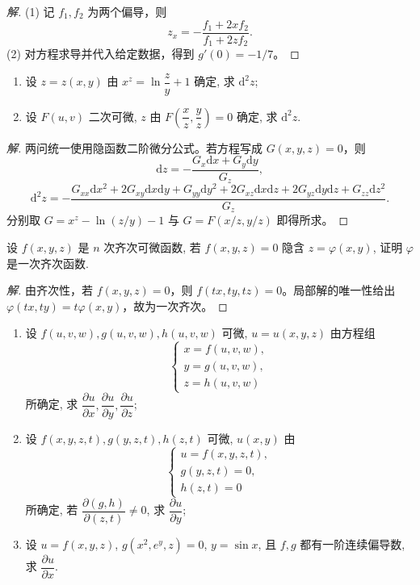 \documentclass[../../数学分析培优讲义(答案版).tex]{subfiles}
\begin{document}
\begin{proof}[解]
(1) 记 $f_1,f_2$ 为两个偏导，则
\[
z_x=-\dfrac{f_1+2xf_2}{f_1+2zf_2}.
\]
(2) 对方程求导并代入给定数据，得到 $g'(0)=-1/7$。
\end{proof}

\begin{example}
\begin{enumerate}[label=(\arabic*)]
    \item 设 $z=z(x,y)$ 由 $\displaystyle x^z=\ln\dfrac{z}{y}+1$ 确定, 求 $\mathrm{d}^2z$;
    \item 设 $F(u,v)$ 二次可微, $z$ 由 $\displaystyle F\left(\dfrac{x}{z},\dfrac{y}{z}\right)=0$ 确定, 求 $\mathrm{d}^2z$.
\end{enumerate}
\end{example}

\begin{proof}[解]
两问统一使用隐函数二阶微分公式。若方程写成 $G(x,y,z)=0$，则
\[
\mathrm dz=-\dfrac{G_x\mathrm dx+G_y\mathrm dy}{G_z},
\]
\[
\mathrm d^2z=-\dfrac{G_{xx}\mathrm dx^2+2G_{xy}\mathrm dx\mathrm dy+G_{yy}\mathrm dy^2
+2G_{xz}\mathrm dx\mathrm dz+2G_{yz}\mathrm dy\mathrm dz+G_{zz}\mathrm dz^2}{G_z}.
\]
分别取 $G=x^z-\ln(z/y)-1$ 与 $G=F(x/z,y/z)$ 即得所求。
\end{proof}

\begin{example}
设 $f(x,y,z)$ 是 $n$ 次齐次可微函数, 若 $f(x,y,z)=0$ 隐含 $z=\varphi(x,y)$, 证明 $\varphi$ 是一次齐次函数.
\end{example}

\begin{proof}[解]
由齐次性，若 $f(x,y,z)=0$，则 $f(tx,ty,tz)=0$。局部解的唯一性给出 $\varphi(tx,ty)=t\varphi(x,y)$，故为一次齐次。
\end{proof}

\begin{example}
\begin{enumerate}[label=(\arabic*)]
    \item 设 $f(u,v,w),g(u,v,w),h(u,v,w)$ 可微, $u=u(x,y,z)$ 由方程组
    \[
        \begin{cases}
            x=f(u,v,w),\\
            y=g(u,v,w),\\
            z=h(u,v,w)
        \end{cases}
    \]
    所确定, 求 $\dfrac{\partial u}{\partial x},\dfrac{\partial u}{\partial y},\dfrac{\partial u}{\partial z}$;
    \item 设 $f(x,y,z,t),g(y,z,t),h(z,t)$ 可微, $u(x,y)$ 由
    \[
        \begin{cases}
            u=f(x,y,z,t),\\
            g(y,z,t)=0,\\
            h(z,t)=0
        \end{cases}
    \]
    所确定, 若 $\dfrac{\partial(g,h)}{\partial(z,t)}\ne0$, 求 $\dfrac{\partial u}{\partial y}$;
    \item 设 $u=f(x,y,z)$, $g(x^2,e^y,z)=0$, $y=\sin x$, 且 $f,g$ 都有一阶连续偏导数, 求 $\dfrac{\partial u}{\partial x}$.
\end{enumerate}
\end{example}
\end{document}
